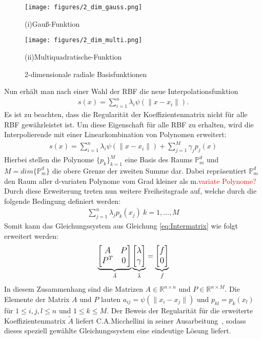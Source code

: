 \documentclass[12pt,titlepage]{article}
\newcommand{\col}[2][red]{\textcolor{#1}{#2}}
\begin{document}
\begin{figure}[H]
	\centering
\hspace{-1.5cm}
\begin{minipage}{0.45\textwidth}
	\texttt{[image: figures/2\_dim\_gauss.png]}
	\caption*{(i)Gauß-Funktion}
\end{minipage}
\hspace{0.6cm}
\begin{minipage}{0.45\textwidth}
	\texttt{[image: figures/2\_dim\_multi.png]}
	\caption*{(ii)Multiquadratische-Funktion}
\end{minipage}
	\caption{2-dimensionale radiale Basisfunktionen}
	\label{fig:RBF_2dim}
\end{figure}
\noindent
Nun erhält man nach einer Wahl der RBF die neue Interpolationsfunktion
\begin{align}
 s(x)=\sum_{i=1}^n\lambda_i\psi(\|x-x_i\|).
\end{align}
Es ist zu beachten, dass die Regularität der Koeffizientenmatrix nicht für alle RBF gewährleistet ist. Um diese Eigenschaft für alle RBF zu erhalten, wird die Interpolierende mit einer Linearkombination von Polynomen erweitert:
\begin{align}
 s(x)=\sum_{i=1}^n\lambda_i\psi(\|x-x_i\|)+\sum_{j=1}^M\gamma_jp_j(x)
\end{align}
Hierbei stellen die Polynome $\{p_k\}_{k=1}^M$ eine Basis des Raums $\mathbb{P}_m^d$ und $M=dim\{\mathbb{P}_m^d\}$ die obere Grenze der zweiten Summe dar. Dabei repräsentiert $\mathbb{P}_m^d$ den Raum aller d-variaten Polynome vom Grad kleiner als m.\col{variate Polynome?} Durch diese Erweiterung treten nun weitere Freiheitsgrade auf, welche durch die folgende Bedingung definiert werden:
\begin{align}
 \sum_{j=1}^n\lambda_jp_k(x_j)~k=1,\dots,M
\end{align}
Somit kann das Gleichungssystem aus Gleichung \eqref{eq:Intermatrix} wie folgt erweitert werden:
\begin{align}
{\large
\underbrace{\begin{bmatrix}
 A & P \\ P^T & 0
\end{bmatrix}}_{\tilde A}
\underbrace{\begin{bmatrix}
 \lambda  \\ \gamma
\end{bmatrix}}_{\tilde\lambda}
=
\underbrace{\begin{bmatrix}
 f  \\ 0
\end{bmatrix}}_{\tilde f}\label{eq:Inter}}
\end{align}
In diesem Zusammenhang sind die Matrizen $A\in\mathbb{R}^{n\times n}$ und $P\in\mathbb{R}^{n\times M}$. Die Elemente der Matrix $A$ und $P$ lauten $a_{ij}=\psi(\|x_i-x_j\|)$ und $p_{kl}=p_k(x_l)$ für $1\le i,j,l\le n$ und $1\le k\le M$. Der Beweis der Regularität für die erweiterte Koeffizientenmatrix $\tilde A$ liefert C.A.Micchellini in seiner Ausarbeitung~\cite{micchelli1984interpolation}, sodass dieses speziell gewählte Gleichungssystem eine eindeutige Lösung liefert.
\end{document}

